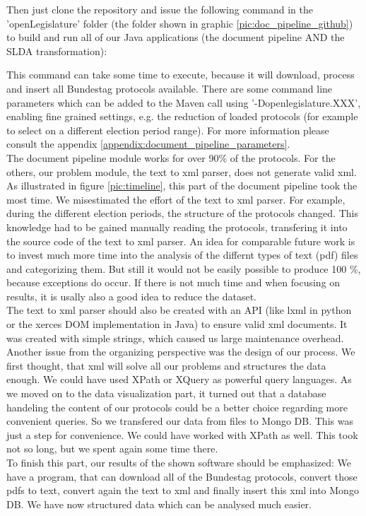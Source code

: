 \documentclass[12pt,paper=a4,nenglish]{scrreprt}
\begin{document}
Then just clone the repository and issue the following command in the
'openLegislature' folder (the folder shown in graphic
\ref{pic:doc_pipeline_github}) to build and run all of our Java applications
(the document pipeline AND the SLDA transformation):
\begin{description}
	 \label{listing:maven_build_comman.}%
\end{description}
This command can take some time to execute, because it will download, process
and insert all Bundestag protocols available. There are some command line
parameters which can be added to the Maven call using '-Dopenlegislature.XXX',
enabling fine grained settings, e.g. the reduction of loaded protocols (for example
to select on a different election period range). For more information please consult the appendix
\ref{appendix:document_pipeline_parameters}. \\
 
The document pipeline module works for over 90\% of the protocols. For the
others, our problem module, the text to xml parser, does not generate valid xml.
As illustrated in figure \ref{pic:timeline}, this part of the document pipeline
took the most time. We misestimated the effort of the text to xml parser. For
example, during the different election periods, the structure of the
protocols changed. This knowledge had to be gained manually reading the
protocols, transfering it into the source code of the text to xml parser. An
idea for comparable future work is to invest much more time into the analysis of
the differnt types of text (pdf) files and categorizing them. But still it would
not be easily possible to produce 100 \%, because exceptions do occur.  
If there is not much time and when focusing on
results, it is usally also a good idea to reduce the dataset.\\ 
The text to xml parser should also be created with an API (like
lxml in python or the xerces DOM implementation in Java) to ensure valid xml documents. It was created with simple strings, which caused us large maintenance overhead. \\
Another issue from the organizing perspective was the design of our process. We
first thought, that xml will solve all our problems and structures the data
enough. We could have used XPath or XQuery as powerful query languages. As we
moved on to the data visualization part, it turned out that a database
handeling the content of our protocols could be a better choice regarding
more convenient queries. So we transfered our data from files to Mongo DB. This
was just a step for convenience. We could have worked with XPath as well. This took not so long,
but we spent again some time there.\\
To finish this part, our results of the shown software should be emphasized: We
have a program, that can download all of the Bundestag protocols, convert those
pdfs to text, convert again the text to xml and finally insert this xml into Mongo DB. 
We have now structured data which can be analysed much easier. 
\end{document}
